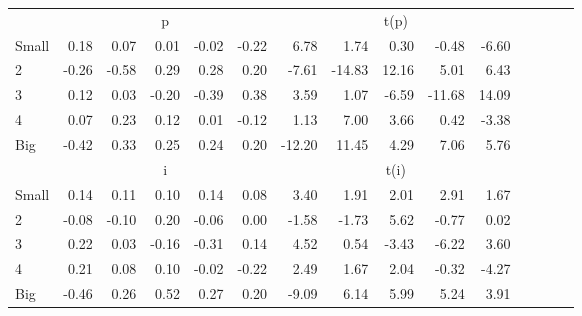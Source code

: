 \begin{table}[!ht]
\begin{tabular}{lrrrrrrrrrrrrrr}
      & \multicolumn{5}{c}{p} & \multicolumn{5}{c}{t(p)}
    
    \\
      \cmidrule(r){2-6} \cmidrule(r){7-11}

    Small   & 0.18  & 0.07  & 0.01  & -0.02  & -0.22  & 6.78  & 1.74  & 0.30  & -0.48  & -6.60  \\
         2  & -0.26  & -0.58  & 0.29  & 0.28  & 0.20  & -7.61  & -14.83  & 12.16  & 5.01  & 6.43  \\
         3  & 0.12  & 0.03  & -0.20  & -0.39  & 0.38  & 3.59  & 1.07  & -6.59  & -11.68  & 14.09  \\
         4  & 0.07  & 0.23  & 0.12  & 0.01  & -0.12  & 1.13  & 7.00  & 3.66  & 0.42  & -3.38  \\
    Big     & -0.42  & 0.33  & 0.25  & 0.24  & 0.20  & -12.20  & 11.45  & 4.29  & 7.06  & 5.76  \\

  
    
      & \multicolumn{5}{c}{i} & \multicolumn{5}{c}{t(i)}
    
    \\
      \cmidrule(r){2-6} \cmidrule(r){7-11}

    Small   & 0.14  & 0.11  & 0.10  & 0.14  & 0.08  & 3.40  & 1.91  & 2.01  & 2.91  & 1.67  \\
         2  & -0.08  & -0.10  & 0.20  & -0.06  & 0.00  & -1.58  & -1.73  & 5.62  & -0.77  & 0.02  \\
         3  & 0.22  & 0.03  & -0.16  & -0.31  & 0.14  & 4.52  & 0.54  & -3.43  & -6.22  & 3.60  \\
         4  & 0.21  & 0.08  & 0.10  & -0.02  & -0.22  & 2.49  & 1.67  & 2.04  & -0.32  & -4.27  \\
    Big     & -0.46  & 0.26  & 0.52  & 0.27  & 0.20  & -9.09  & 6.14  & 5.99  & 5.24  & 3.91  \\

  

  \bottomrule
\end{tabular}
\label{tbl:25_Size_NI_F15}
\end{table}